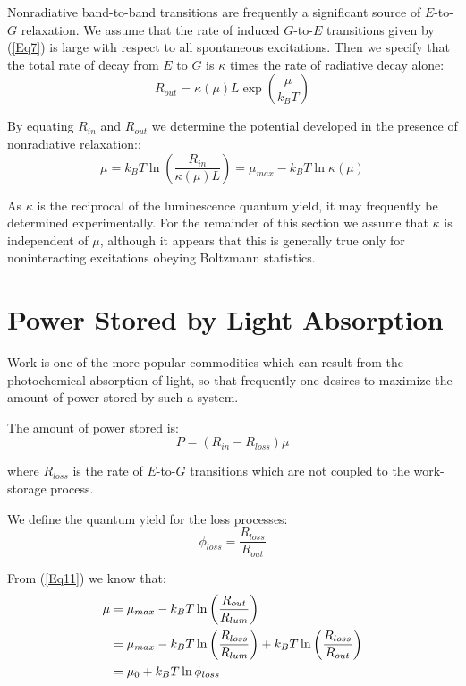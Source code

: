 \documentclass[book.tex]{subfiles}
\begin{document}
Nonradiative band-to-band transitions are frequently a significant source of $E$-to-$G$ relaxation. We assume that the rate of induced $G$-to-$E$ transitions given by (\ref{Eq7}) is large with respect to all spontaneous excitations. Then we specify that the total rate of decay from $E$ to $G$ is $\kappa$ times the rate of radiative decay alone:
\begin{equation}\label{Eq10}
R_{out}=\kappa(\mu)L\exp\left( \frac{\mu}{k_BT} \right)
\end{equation}

By equating $R_{in}$ and $R_{out}$ we determine the potential developed in the presence of nonradiative relaxation::
\begin{equation}\label{Eq11}
\mu = k_BT\ln\left( \frac{R_{in}}{\kappa(\mu)L} \right) = \mu_{max} - k_BT\ln \kappa(\mu)
\end{equation}

As $\kappa$ is the reciprocal of the luminescence quantum yield, it may frequently be determined experimentally. For the remainder of this section we assume that $\kappa$ is independent of $\mu$, although it appears that this is generally true only for noninteracting excitations obeying Boltzmann statistics.

\section{Power Stored by Light Absorption}

Work is one of the more popular commodities which can result from the photochemical absorption of light, so that frequently one desires to maximize the amount of power stored by such a system.

The amount of power stored is:
\begin{equation}\label{Eq12}
P= (R_{in} - R_{loss})\mu
\end{equation}

\noindent where $R_{loss}$ is the rate of $E$-to-$G$ transitions which are not coupled to the work-storage process.
%

We define the quantum yield for the loss processes:
\begin{equation}\label{Eq14}
\phi_{loss} = \frac{R_{loss}}{R_{out}}
\end{equation}

From (\ref{Eq11}) we know that:
\begin{align}\label{Eq15}
\mu &= \mu_{max} - k_BT\ln\left(\frac{R_{out}}{R_{lum}}\right) \notag\\
&= \mu_{max} - k_BT\ln\left(\frac{R_{loss}}{R_{lum}}\right) + k_BT\ln\left(\frac{R_{loss}}{R_{out}}\right) \notag\\
&= \mu_0 + k_BT\ln\phi_{loss}
\end{align}
\end{document}
